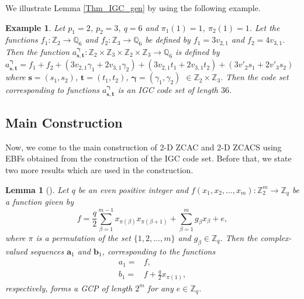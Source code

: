 \documentclass[pdflatex,sn-mathphys-num]{sn-jnl}%
\theoremstyle{thmstyleone}
\newtheorem{lemma}{Lemma}
\newtheorem{example}{Example}
\begin{document}
	
	We illustrate Lemma \ref{Thm_IGC_gen} by using the following example.
	\begin{example}\label{example_igc}
		Let $p_1=2$, $p_2=3$, $q=6$ and $\pi_1 (1)=1$, $\pi_2(1)=1$. Let the functions $f_1 : \mathbb{Z}_2 \rightarrow \mathbb{Q}_6$ and $f_2 : \mathbb{Z}_3 \rightarrow \mathbb{Q}_6$ be defined by
		$f_1=3v_{2,1}$ and $f_2= 4v_{3,1}$. Then the function $a_{\mathbf{s}, \mathbf{t}}^{\bm{\gamma}} : \mathbb{Z}_2 \times \mathbb{Z}_3 \times \mathbb{Z}_2 \times \mathbb{Z}_3 \rightarrow \mathbb{Q}_6$ is defined by $a_{\mathbf{s}, \mathbf{t}}^{\bm{\gamma}}= f_1 +f_2+ (3v_{2,1}\gamma_1+ 2v_{3,1} \gamma_2) + (3v_{2,1}t_1+ 2v_{3,1} t_2) + (3v'_{2} s_1+ 2v'_{3} s_2)$ where $\mathbf{s}=(s_1, s_2)$, $\mathbf{t}=(t_1, t_2)$, $\bm{\gamma}=(\gamma_1, \gamma_2)$ $\in \mathbb{Z}_2 \times \mathbb{Z}_3$. Then the code set corresponding to functions $a_{\mathbf{s}, \mathbf{t}}^{\bm{\gamma}}$ is an IGC code set of length $36$.
	\end{example}
	
	\subsection{Main Construction}
	Now, we come to the main construction of 2-D ZCAC and 2-D ZCACS using EBFs obtained from the construction of the IGC code set. Before that, we state two more results which are used in the construction.
	\begin{lemma}[\cite{paterson}]\label{lemma_GCP}
		Let $q$ be an even positive integer and $f \left( x_1, x_2, \dots, x_m \right): \mathbb{Z}_2^{m} \rightarrow \mathbb{Z}_q$ be a function given by
		\begin{equation}
			f = \frac{q}{2} \sum_{\beta=1}^{m-1} x_{\pi(\beta)} x_{\pi(\beta+1)} +\sum_{\beta=1}^{m} g_\beta x_\beta +e,
		\end{equation}
		where $\pi$ is a permutation of the set $\{1,2, \dots, m\}$ and $g_\beta \in \mathbb{Z}_q$. Then the complex-valued sequences $\mathbf{a}_1$ and $\mathbf{b}_1$, corresponding to the functions 
		\begin{equation}
			\begin{split}
				a_1= &f,\\
				b_1 = &f + \frac{q}{2} x_{\pi(1)},
			\end{split}
		\end{equation}
		respectively, forms a GCP of length $2^m$ for any $e \in \mathbb{Z}_q$.
	\end{lemma}
	
\end{document}
